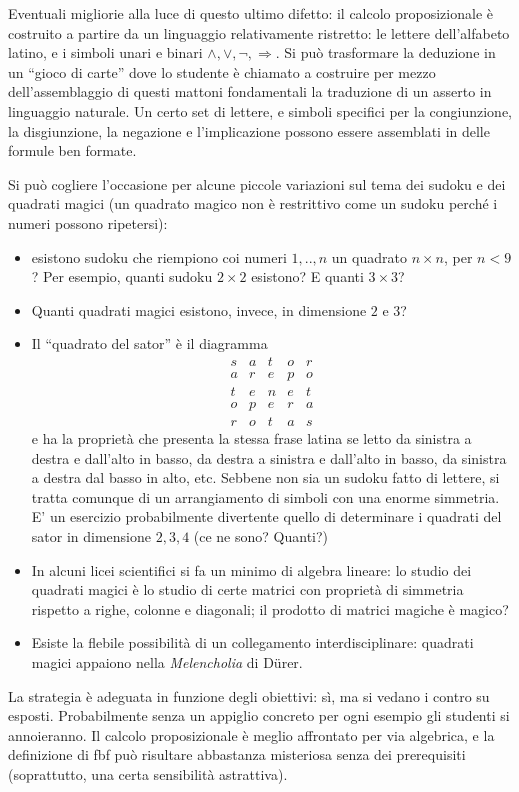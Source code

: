 \documentclass{article}
\begin{document}
Eventuali migliorie alla luce di questo ultimo difetto: il calcolo proposizionale è costruito a partire da un linguaggio relativamente ristretto: le lettere dell'alfabeto latino, e i simboli unari e binari $\land, \lor, \lnot, \Rightarrow$. Si può trasformare la deduzione in un ``gioco di carte'' dove lo studente è chiamato a costruire per mezzo dell'assemblaggio di questi mattoni fondamentali la traduzione di un asserto in linguaggio naturale. Un certo set di lettere, e simboli specifici per la congiunzione, la disgiunzione, la negazione e l'implicazione possono essere assemblati in delle formule ben formate.

Si può cogliere l'occasione per alcune piccole variazioni sul tema dei sudoku e dei quadrati magici (un quadrato magico non è restrittivo come un sudoku perché i numeri possono ripetersi):
\begin{itemize}
  \item esistono sudoku che riempiono coi numeri $1,..,n$ un quadrato $n\times n$, per $n < 9$? Per esempio, quanti sudoku $2\times 2$ esistono? E quanti $3\times 3$?
  \item Quanti quadrati magici esistono, invece, in dimensione $2$ e $3$?
  \item Il ``quadrato del sator'' è il diagramma
  \[
  \begin{smallmatrix}
    s&a&t&o&r\\
    a&r&e&p&o\\
    t&e&n&e&t\\
    o&p&e&r&a\\
    r&o&t&a&s
  \end{smallmatrix}  
  \]
  e ha la proprietà che presenta la stessa frase latina se letto da sinistra a destra e dall'alto in basso, da destra a sinistra e dall'alto in basso, da sinistra a destra dal basso in alto, etc. Sebbene non sia un sudoku fatto di lettere, si tratta comunque di un arrangiamento di simboli con una enorme simmetria. E' un esercizio probabilmente divertente  quello di determinare i quadrati del sator in dimensione $2,3,4$ (ce ne sono? Quanti?)
  \item In alcuni licei scientifici si fa un minimo di algebra lineare: lo studio dei quadrati magici è lo studio di certe matrici con proprietà di simmetria rispetto a righe, colonne e diagonali; il prodotto di matrici magiche è magico?
  \item Esiste la flebile possibilità di un collegamento interdisciplinare: quadrati magici appaiono nella \emph{Melencholia} di D\"urer.
\end{itemize}
La strategia è adeguata in funzione degli obiettivi: sì, ma si vedano i contro su esposti. Probabilmente senza un appiglio concreto per ogni esempio gli studenti si annoieranno. Il calcolo proposizionale è meglio affrontato per via algebrica, e la definizione di fbf può risultare abbastanza misteriosa senza dei prerequisiti (soprattutto, una certa sensibilità astrattiva).
\end{document}
